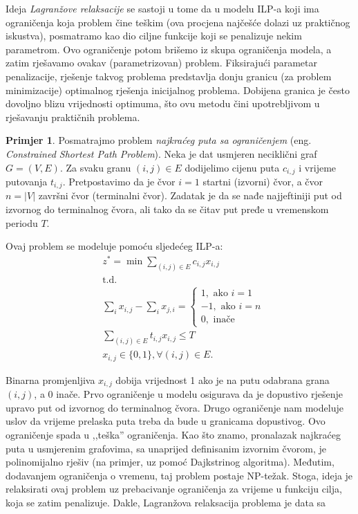 \documentclass[a4paper, utf8, 11pt, colorlinks]{book}
\theoremstyle{definition}
\newtheorem{primjer}{Primjer}[chapter]
\begin{document}
Ideja \emph{Lagranžove relaksacije} se sastoji u tome da u modelu ILP-a  koji ima  ograničenja koja problem čine teškim (ova procjena najčešće dolazi uz praktičnog iskustva),  posmatramo kao dio ciljne funkcije koji se penalizuje nekim parametrom.  %
Ovo ograničenje potom brišemo iz skupa ograničenja modela, a zatim rješavamo ovakav (parametrizovan) problem. Fiksirajući parametar penalizacije, rješenje takvog problema predstavlja donju granicu (za problem minimizacije)  optimalnog rješenja inicijalnog problema. Dobijena granica je često dovoljno blizu vrijednosti optimuma, što ovu metodu čini upotrebljivom u rješavanju praktičnih problema. 

\begin{primjer} Posmatrajmo problem \emph{najkraćeg puta sa ograničenjem} (eng. \emph{Constrained Shortest Path Problem}). Neka je dat usmjeren neciklični graf $G=(V,E)$. Za svaku granu $(i,j) \in E$ dodijelimo cijenu puta $c_{i,j}$ i vrijeme putovanja $t_{i,j}$. Pretpostavimo da je čvor $i=1$ startni (izvorni) čvor, a čvor $n = |V|$   završni čvor (terminalni čvor). Zadatak je da se nađe najjeftiniji put  od izvornog do terminalnog čvora, ali tako da se čitav put pređe u vremenskom periodu $T$.
\end{primjer}
Ovaj problem se modeluje pomoću sljedećeg ILP-a:
 \begin{align}
    &z^*=\min\sum_{(i,j) \in E }c_{i,j}x_{i,j} \\
    &\mbox{t.d. }\\
    & \sum_{i} x_{i,j} - \sum_{i} x_{j,i} = \begin{cases}  
                                               1, \mbox{ ako } i=1 \\
                                              -1, \mbox{ ako } i=n \\
                                               0, \mbox{ inače }
                                            \end{cases} \\
    & \sum_{(i,j) \in E} t_{i,j} x_{i,j} \leq T \\
    & x_{i,j} \in \{0, 1 \}, \forall (i,j) \in E.
\end{align} 

Binarna promjenljiva $x_{i,j}$ dobija vrijednost 1 ako je  na   putu odabrana grana $(i,j)$, a 0 inače. 
Prvo ograničenje u modelu osigurava da je dopustivo rješenje upravo put od izvornog do terminalnog čvora. Drugo ograničenje nam modeluje uslov da vrijeme prelaska puta treba da bude u  granicama dopustivog. Ovo ograničenje spada u ,,teška'' ograničenja. Kao što znamo,  pronalazak najkraćeg puta u usmjerenim grafovima, sa unaprijed definisanim izvornim čvorom, je polinomijalno rješiv (na primjer, uz pomoć Dajkstrinog algoritma). Međutim,  dodavanjem ograničenja o vremenu, taj problem postaje NP-težak. Stoga, ideja je  relaksirati ovaj problem uz prebacivanje ograničenja za vrijeme u funkciju cilja, koja se zatim penalizuje. 
Dakle, Lagranžova relaksacija problema je data sa
\end{document}
